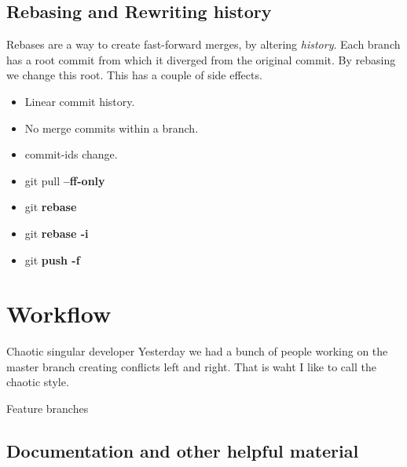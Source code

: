 \documentclass{beamer}
\begin{document}
\subsection{Rebasing and Rewriting history}
\begin{frame}[fragile]
  Rebases are a way to create fast-forward merges, by altering \emph{history}. Each branch has a root commit from which it diverged from the original commit. By rebasing we change this root. This has a couple of side effects. 
  \begin{itemize}
    \item Linear commit history.
    \item No merge commits within a branch.
    \item commit-ids change.
  \end{itemize}

  \begin{block}{}
    \begin{itemize}
      \item git pull \textbf{--ff-only}
      \item git \textbf{rebase}
      \item git \textbf{rebase -i}
      \item git \textbf{push -f}
    \end{itemize}
  \end{block}
\end{frame}
\section{Workflow}
\begin{frame}[fragile]{Chaotic singular developer}
  Yesterday we had a bunch of people working on the master branch creating conflicts left and right. That is waht I like to call the chaotic style. 
\end{frame}
\begin{frame}[fragile]{Feature branches}
\end{frame}
\subsection{Documentation and other helpful material}
\end{document}
